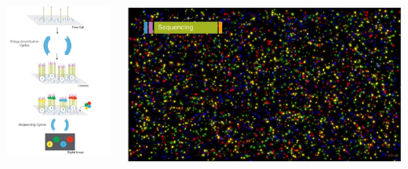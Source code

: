 \documentclass[x11names, svgnames]{beamer}
\begin{document}
%
%
%
\begin{frame}
  \frametitle{\four}
  \begin{columns}[T]
    \begin{column}{0.5\textwidth}
      \begin{center}
        \vspace{-2em}
        \includegraphics[scale=0.55]{images/illumina_sequencing}
      \end{center}
    \end{column}
    \begin{column}{0.5\textwidth}
      \begin{center}
        \vspace{-1em}
        \includegraphics[scale=0.15]{images/illumina_video}

\end{center}
\end{column}
\end{columns}
\end{frame}
\end{document}
